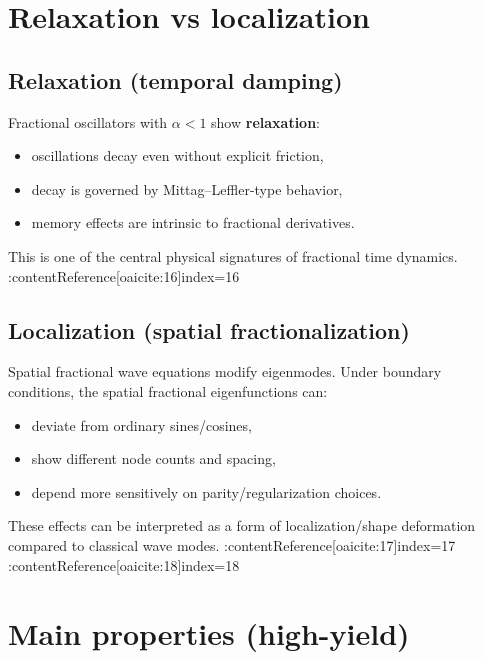 \section{Relaxation vs localization}

\subsection{Relaxation (temporal damping)}
Fractional oscillators with $\alpha<1$ show \textbf{relaxation}:
\begin{itemize}
\item oscillations decay even without explicit friction,
\item decay is governed by Mittag--Leffler-type behavior,
\item memory effects are intrinsic to fractional derivatives.
\end{itemize}
This is one of the central physical signatures of fractional time dynamics. :contentReference[oaicite:16]{index=16}

\subsection{Localization (spatial fractionalization)}
Spatial fractional wave equations modify eigenmodes.
Under boundary conditions, the spatial fractional eigenfunctions can:
\begin{itemize}
\item deviate from ordinary sines/cosines,
\item show different node counts and spacing,
\item depend more sensitively on parity/regularization choices.
\end{itemize}
These effects can be interpreted as a form of localization/shape deformation
compared to classical wave modes. :contentReference[oaicite:17]{index=17} :contentReference[oaicite:18]{index=18}


\section{Main properties (high-yield)}

